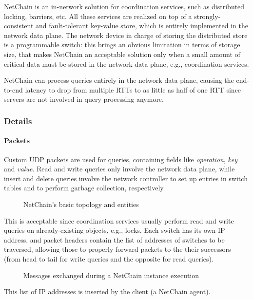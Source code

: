 NetChain \cite{netchain} is an in-network solution for coordination services, such as distributed locking, barriers, etc.
All these services are realized on top of a strongly-consistent and fault-tolerant key-value store, which is entirely implemented in the network data plane.
The network device in charge of storing the distributed store is a programmable switch: this brings an obvious limitation in terms of storage size, that makes NetChain \cite{netchain} an acceptable solution only when a small amount of critical data must be stored in the network data plane, e.g., coordination services.\par
NetChain \cite{netchain} can process queries entirely in the network data plane, causing the end-to-end latency to drop from multiple RTTs to as little as half of one RTT since servers are not involved in query processing anymore.

\subsubsection{Details}
\paragraph{Packets}
Custom UDP packets are used for queries, containing fields like \textit{operation}, \textit{key} and \textit{value}.
Read and write queries only involve the network data plane, while insert and delete queries involve the network controller to set up entries in switch tables and to perform garbage collection, respectively.

\begin{figure}[!htb]
    \centering
    \usebox{\netchainbasic}
    \caption{NetChain's \texorpdfstring{\cite{netchain}}{} basic topology and entities}
\end{figure}

This is acceptable since coordination services usually perform read and write queries on already-existing objects, e.g., locks.
Each switch has its own IP address, and packet headers contain the list of addresses of switches to be traversed, allowing those to properly forward packets to the their successors (from head to tail for write queries and the opposite for read queries).
\begin{figure}[!htb]
    \centering
    \usebox{\netchainsd}
    \caption{Messages exchanged during a NetChain \texorpdfstring{\cite{netchain}}{} instance execution}
\end{figure}
This list of IP addresses is inserted by the client (a NetChain \cite{netchain} agent).

